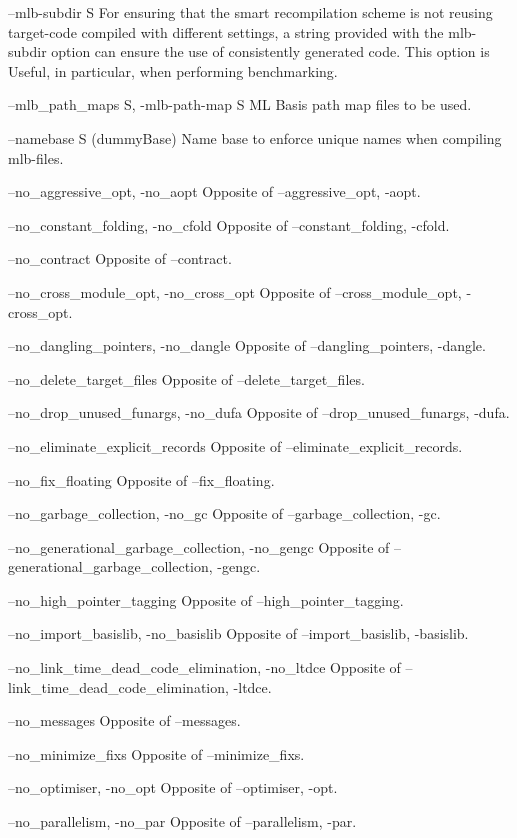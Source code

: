 \documentclass[12pt]{book}
\begin{document}
\begin{scriptcode}
--mlb-subdir S
     For ensuring that the smart recompilation scheme
     is not reusing target-code compiled with different
     settings, a string provided with the mlb-subdir
     option can ensure the use of consistently generated
     code. This option is Useful, in particular, when
     performing benchmarking.

--mlb_path_maps S, -mlb-path-map S
     ML Basis path map files to be used.

--namebase S                                       (dummyBase)
     Name base to enforce unique names when compiling
     mlb-files.

--no_aggressive_opt, -no_aopt
     Opposite of --aggressive_opt, -aopt.

--no_constant_folding, -no_cfold
     Opposite of --constant_folding, -cfold.

--no_contract
     Opposite of --contract.

--no_cross_module_opt, -no_cross_opt
     Opposite of --cross_module_opt, -cross_opt.

--no_dangling_pointers, -no_dangle
     Opposite of --dangling_pointers, -dangle.

--no_delete_target_files
     Opposite of --delete_target_files.

--no_drop_unused_funargs, -no_dufa
     Opposite of --drop_unused_funargs, -dufa.

--no_eliminate_explicit_records
     Opposite of --eliminate_explicit_records.

--no_fix_floating
     Opposite of --fix_floating.

--no_garbage_collection, -no_gc
     Opposite of --garbage_collection, -gc.

--no_generational_garbage_collection, -no_gengc
     Opposite of --generational_garbage_collection, -gengc.

--no_high_pointer_tagging
     Opposite of --high_pointer_tagging.

--no_import_basislib, -no_basislib
     Opposite of --import_basislib, -basislib.

--no_link_time_dead_code_elimination, -no_ltdce
     Opposite of --link_time_dead_code_elimination, -ltdce.

--no_messages
     Opposite of --messages.

--no_minimize_fixs
     Opposite of --minimize_fixs.

--no_optimiser, -no_opt
     Opposite of --optimiser, -opt.

--no_parallelism, -no_par
     Opposite of --parallelism, -par.


\end{scriptcode}
\end{document}
